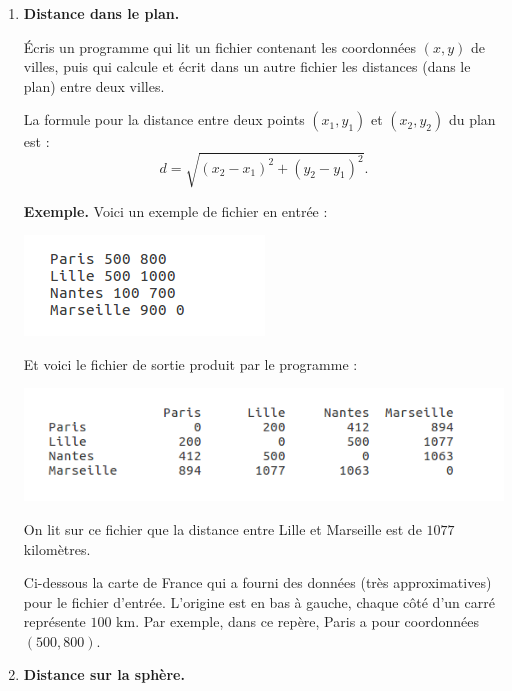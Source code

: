 \documentclass[11pt,class=report,crop=false]{standalone}
\begin{document}
\begin{activite}


\begin{enumerate}
  \item \textbf{Distance dans le plan.} 
  
  Écris un programme qui lit un fichier contenant les coordonnées $(x,y)$ de villes, puis qui calcule et écrit dans un autre fichier les distances (dans le plan) entre deux villes.
  
  La formule pour la distance entre deux points $(x_1,y_1)$ et $(x_2,y_2)$ du plan est :
  $$d = \sqrt{(x_2-x_1)^2 + (y_2-y_1)^2}.$$
  
  
\textbf{Exemple.} Voici un exemple de fichier en entrée :
\begin{center}
\includegraphics[scale=\myscale,scale=0.7]{ecran-fichiers-4a}
\end{center}   

Et voici le fichier de sortie produit par le programme :
\begin{center}
\includegraphics[scale=\myscale,scale=0.7]{ecran-fichiers-4b} 
\end{center}   
On lit sur ce fichier que la distance entre Lille et Marseille est de $1077$ kilomètres.


Ci-dessous la carte de France qui a fourni des données (très approximatives) pour le fichier d'entrée. L'origine est en bas à gauche, chaque côté d'un carré représente $100$ km. Par exemple, dans ce repère, Paris a pour coordonnées $(500,800)$.
 


  \item \textbf{Distance sur la sphère.} 
  

\end{enumerate}
\end{activite}
\end{document}

